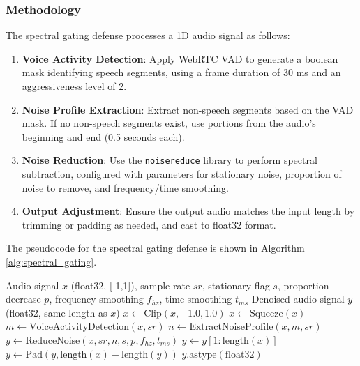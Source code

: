 \documentclass[a4paper,12pt]{article}
\begin{document}
\subsubsection{Methodology}
The spectral gating defense processes a 1D audio signal as follows:
\begin{enumerate}
    \item \textbf{Voice Activity Detection}: Apply WebRTC VAD to generate a boolean mask identifying speech segments, using a frame duration of 30 ms and an aggressiveness level of 2.
    \item \textbf{Noise Profile Extraction}: Extract non-speech segments based on the VAD mask. If no non-speech segments exist, use portions from the audio's beginning and end (0.5 seconds each).
    \item \textbf{Noise Reduction}: Use the \texttt{noisereduce} library to perform spectral subtraction, configured with parameters for stationary noise, proportion of noise to remove, and frequency/time smoothing.
    \item \textbf{Output Adjustment}: Ensure the output audio matches the input length by trimming or padding as needed, and cast to float32 format.
\end{enumerate}

The pseudocode for the spectral gating defense is shown in Algorithm \ref{alg:spectral_gating}.

\begin{algorithm}
\caption{Spectral Gating Defense}
\label{alg:spectral_gating}
\begin{algorithmic}[1]
\Require Audio signal $x$ (float32, [-1,1]), sample rate $sr$, stationary flag $s$, proportion decrease $p$, frequency smoothing $f_{hz}$, time smoothing $t_{ms}$
\Ensure Denoised audio signal $y$ (float32, same length as $x$)
\State $x \gets \text{Clip}(x, -1.0, 1.0)$ 
\State $x \gets \text{Squeeze}(x)$ 
\State $m \gets \text{VoiceActivityDetection}(x, sr)$ 
\State $n \gets \text{ExtractNoiseProfile}(x, m, sr)$ 
\State $y \gets \text{ReduceNoise}(x, sr, n, s, p, f_{hz}, t_{ms})$ 
    \State $y \gets y[1:\text{length}(x)]$ 
    \State $y \gets \text{Pad}(y, \text{length}(x) - \text{length}(y))$ 
\EndIf
\State \Return $y.\text{astype}(\text{float32})$
\end{algorithmic}
\end{algorithm}
\end{document}
